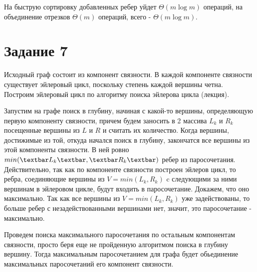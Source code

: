 \documentclass[a4paper,12pt]{article}
\begin{document}
На быструю сортировку добавленных ребер уйдет $\Theta(m\log{m})$ операций, на объединение отрезков $\Theta(m)$ операций, всего - $\Theta(m\log{m})$.

\section*{Задание 7}
\hspace{0.5cm}
Исходный граф состоит из компонент связности. В каждой компоненте связности существует эйлеровый цикл, поскольку степень каждой вершины четна. Построим эйлеровый цикл по алгоритму поиска эйлерова цикла (лекция).

Запустим на графе поиск в глубину, начиная с какой-то вершины, определяющую первую компоненту связности, причем будем заносить в 2 массива $L_{k}$ и $R_{k}$ посещенные вершины из $L$ и $R$ и считать их количество. Когда вершины, достижимые из той, откуда начался поиск в глубину, закончатся все вершины из этой компоненты связности. В ней ровно $min(\textbar L_{k}\textbar,\textbar R_{k}\textbar)$ ребер из паросочетания. Действительно, так как по компоненте связности построен эйлеров цикл, то ребра, соединяющие вершины из $V=min( L_{k}, R_{k})$ c следующими за ними вершинам в эйлеровом цикле, будут входить в паросочетание. Докажем, что оно максимально. Так как все вершины из $V=min( L_{k}, R_{k})$ уже задействованы, то больше ребер с незадействованными вершинами нет, значит, это паросочетание - максимально. 

Проведем поиска максимального паросочетания по остальным компонентам связности, просто беря еще не пройденную алгоритмом поиска в глубину вершину. Тогда максимальным паросочетанием для графа будет обьединение максимальных паросочетаний его компонент связности.
\end{document}
